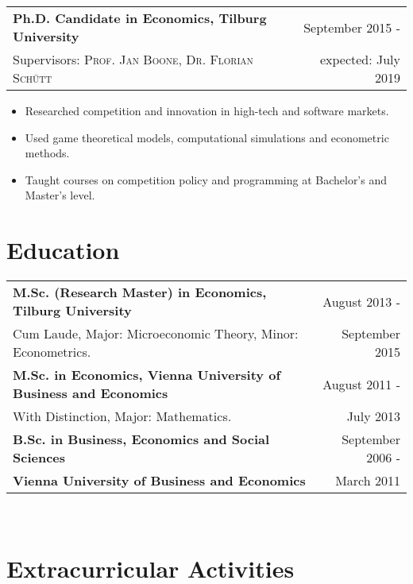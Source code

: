 \documentclass[a4paper,9pt]{article}
\begin{document}
\begin{tabular}{p{15cm} r}
	\textbf{Ph.D. Candidate in Economics, Tilburg University} &September 2015 -\\
	\small Supervisors:  \textsc{Prof. Jan Boone},  \textsc{Dr. Florian Schütt} & expected: July 2019\phantom{ -}\\
\end{tabular}\vspace{-0.5em}
\begin{itemize}[noitemsep]
	\item Researched competition and innovation in high-tech and software markets.
	\item Used game theoretical models, computational simulations and econometric methods.
	\item Taught courses on competition policy and programming at Bachelor's and Master's level.
\end{itemize}

\section{Education}%

\begin{tabular}{p{15cm} r}
	\textbf{M.Sc. (Research Master) in Economics, Tilburg University}&  August 2013 -\\
	Cum Laude, Major: Microeconomic Theory, Minor: Econometrics.& September 2015\hphantom{-}
	\vspace{0.5em}\\
	\textbf{M.Sc. in Economics, Vienna University of Business and Economics}& August 2011 -\\
	With Distinction, Major: Mathematics. & July 2013\phantom{-}
	\vspace{0.5em}\\ 
	\textbf{B.Sc. in Business, Economics and Social Sciences}& September 2006 -\\ 
	\textbf{Vienna University of Business and Economics}& March 2011\phantom{- }\\
\end{tabular}\\

\section{Extracurricular Activities }
\end{document}
